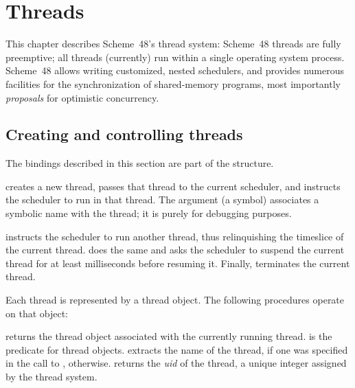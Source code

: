 \chapter{Threads}


This chapter describes Scheme~48's thread system: Scheme~48 threads
are fully preemptive; all threads (currently) run within a single
operating system process.  Scheme~48 allows writing customized, nested
schedulers, and provides numerous facilities for the synchronization
of shared-memory programs, most importantly \textit{proposals} for
optimistic concurrency.

\section{Creating and controlling threads}

The bindings described in this section are part of the 
structure.
%
\begin{protos}
\end{protos}
%
 creates a new thread, passes that thread to the current
scheduler, and instructs the scheduler to run  in that
thread.  The  argument (a symbol) associates a symbolic
name with the thread; it is purely for debugging purposes.
%
\begin{protos}
\end{protos}
%
 instructs the scheduler to run another
thread, thus relinquishing the timeslice of the current thread.
 does the same and asks the scheduler to suspend the
current thread for at least  milliseconds
before resuming it.  Finally, 
terminates the current thread.

Each thread is represented by a thread object.  The following
procedures operate on that object:
%
\begin{protos}
\end{protos}
%
 returns the thread object associated with the
currently running thread.  
 is the predicate for thread objects.
 extracts the name of the thread, if one was
specified in the call to ,  otherwise.
 returns the \textit{uid} of the thread, a unique
integer assigned by the thread system.

